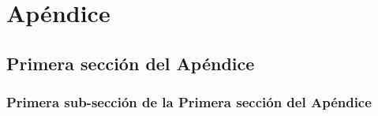 \chapter{Ap\'endice}

\section{Primera secci\'on del Ap\'endice}
\subsection{Primera sub-secci\'on de la Primera secci\'on del Ap\'endice}
